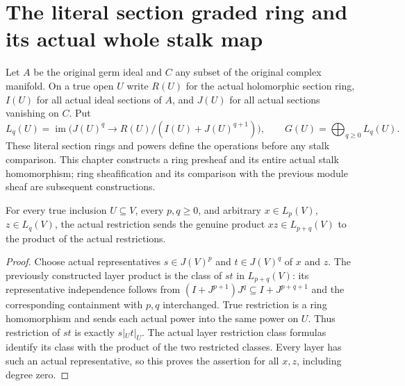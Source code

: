 \section{The literal section graded ring and its actual whole stalk map}

Let $A$ be the original germ ideal and $C$ any subset of the original complex
manifold. On a true open $U$ write $R(U)$ for the actual holomorphic section
ring, $I(U)$ for all actual ideal sections of $A$, and $J(U)$ for all actual
sections vanishing on $C$. Put
\[
 L_q(U)=\operatorname{im}\bigl(J(U)^q\longrightarrow
 R(U)/(I(U)+J(U)^{q+1})\bigr),\qquad
 G(U)=\bigoplus_{q\geq0} L_q(U).
\]
These literal section rings and powers define the operations before any
stalk comparison. This chapter constructs a ring presheaf and its entire
actual stalk homomorphism; ring sheafification and its comparison with the
previous module sheaf are subsequent constructions.

\begin{lemma}
\label{hir:real-domain-actual-normal-section-layer-product-restriction}
\leanok
For every true inclusion $U\subseteq V$, every $p,q\geq0$, and arbitrary
$x\in L_p(V)$, $z\in L_q(V)$, the actual restriction sends the genuine
product $xz\in L_{p+q}(V)$ to the product of the actual restrictions.
\end{lemma}
\begin{proof}
Choose actual representatives $s\in J(V)^p$ and $t\in J(V)^q$ of $x$ and
$z$. The previously constructed layer product is the class of $st$ in
$L_{p+q}(V)$: its representative independence follows from
$(I+J^{p+1})J^q\subseteq I+J^{p+q+1}$ and the corresponding containment
with $p,q$ interchanged. True restriction is a ring homomorphism and sends
each actual power into the same power on $U$. Thus restriction of $st$ is
exactly $s|_U t|_U$. The actual layer restriction class formulas identify
its class with the product of the two restricted classes. Every layer
has such an actual representative, so this proves the assertion for all
$x,z$, including degree zero.
\end{proof}

